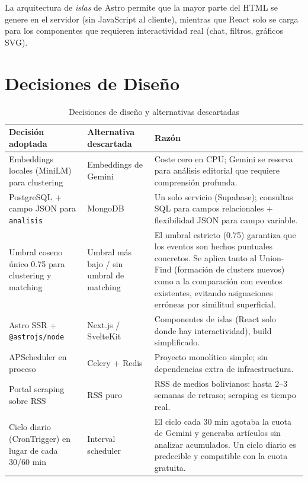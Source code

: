\documentclass[12pt,a4paper]{article}
\begin{document}
La arquitectura de \textit{islas} de Astro permite que la mayor parte del HTML se genere en el servidor (sin JavaScript al cliente), mientras que React solo se carga para los componentes que requieren interactividad real (chat, filtros, gráficos SVG).

\section{Decisiones de Diseño}

\begin{table}[h]
\centering
\caption{Decisiones de diseño y alternativas descartadas}
\begin{tabular}{@{}p{4.2cm}p{3.5cm}p{5.5cm}@{}}
\toprule
\rowcolor{azulAS!15}
\textbf{Decisión adoptada} & \textbf{Alternativa descartada} & \textbf{Razón} \\
\midrule
Embeddings locales (MiniLM) para clustering
  & Embeddings de Gemini
  & Coste cero en CPU; Gemini se reserva para análisis editorial que requiere comprensión profunda. \\
\rowcolor{grisCelda}
PostgreSQL + campo JSON para \texttt{analisis}
  & MongoDB
  & Un solo servicio (Supabase); consultas SQL para campos relacionales + flexibilidad JSON para campo variable. \\
Umbral coseno único 0.75 para clustering y matching
  & Umbral más bajo / sin umbral de matching
  & El umbral estricto (0.75) garantiza que los eventos son hechos puntuales concretos. Se aplica tanto al Union-Find (formación de clusters nuevos) como a la comparación con eventos existentes, evitando asignaciones erróneas por similitud superficial. \\
\rowcolor{grisCelda}
Astro SSR + \texttt{@astrojs/node}
  & Next.js / SvelteKit
  & Componentes de islas (React solo donde hay interactividad), build simplificado. \\
APScheduler en proceso
  & Celery + Redis
  & Proyecto monolítico simple; sin dependencias extra de infraestructura. \\
\rowcolor{grisCelda}
Portal scraping sobre RSS
  & RSS puro
  & RSS de medios bolivianos: hasta 2--3 semanas de retraso; scraping es tiempo real. \\
Ciclo diario (CronTrigger) en lugar de cada 30/60 min
  & Interval scheduler
  & El ciclo cada 30 min agotaba la cuota de Gemini y generaba artículos sin analizar acumulados. Un ciclo diario es predecible y compatible con la cuota gratuita. \\

\end{tabular}
\end{table}
\end{document}
